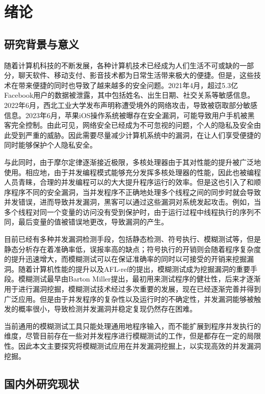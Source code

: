 \cleardoublepage

\section{绪论}

\subsection{研究背景与意义}

随着计算机科技的不断发展，各种计算机技术已经成为人们生活不可或缺的一部分，聊天软件、移动支付、影音技术都为日常生活带来极大的便捷。但是，这些技术在带来便捷的同时也导致了越来越多的安全问题。2021年4月，超过5.3亿Facebook用户的数据被泄露，其中包括姓名、出生日期、社交关系等敏感信息。2022年6月，西北工业大学发布声明称遭受境外的网络攻击，导致被窃取部分敏感信息。2023年6月，苹果iOS操作系统被曝存在安全漏洞，可能导致用户手机被黑客完全控制。由此可见，网络安全已经成为不可忽视的问题，个人的隐私及安全由此受到严重的威胁。因此需要尽量减少计算机系统中的漏洞，在让人们享受便捷的同时能够保护个人隐私安全。

与此同时，由于摩尔定律逐渐接近极限，多核处理器由于其对性能的提升被广泛地使用。相应地，由于并发编程模式能够充分发挥多核处理器的性能，因此也被编程人员青睐，合理的并发编程可以的大大提升程序运行的效率。但是这也引入了和顺序程序不同的安全漏洞，当并发程序不正确地处理多个线程之间的同步时就会导致并发错误，进而导致并发漏洞，黑客可以通过这些漏洞对系统发起攻击。例如，当多个线程对同一个变量的访问没有受到保护时，由于运行过程中线程执行的序列不同，最后变量的值被错误地更改，导致漏洞的产生。

目前已经有多种并发漏洞检测手段，包括静态检测、符号执行、模糊测试等，但是静态分析存在着准确率低，误报率高的缺点；符号执行的开销则会随着程序复杂度的提升迅速增大，而模糊测试可以在保证准确率的同时以可接受的开销来挖掘漏洞。随着计算机性能的提升以及AFL-ref的提出，模糊测试成为挖掘漏洞的重要手段。模糊测试最早由Barton Miller提出，最初用来测试程序的健壮性，后来才逐渐用于进行漏洞挖掘，模糊测试技术经过多次重要的发展，现在已经逐渐完善并得到广泛应用。但是由于并发程序的复杂性以及运行时的不确定性，并发漏洞能够被触发的概率很小，导致检测并发漏洞并稳定复现仍然存在困难。

当前通用的模糊测试工具只能处理通用地程序输入，而不能扩展到程序并发执行的维度，尽管目前存在一些对并发程序进行模糊测试的工作，但是都存在一定的局限性。因此本文主要探究将模糊测试应用在并发漏洞挖掘上，以实现高效的并发漏洞挖掘。


\subsection{国内外研究现状}

